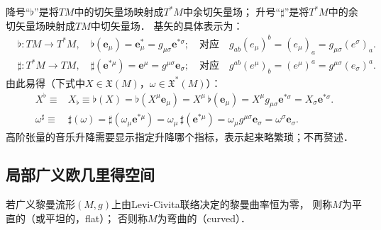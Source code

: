 降号“$\flat$”是将$TM$中的切矢量场映射成$T^*M$中余切矢量场；
升号“$\sharp$”是将$T^*M$中的余切矢量场映射成$TM$中切矢量场．
基矢的具体表示为：
\begin{align*}
	&\flat: TM \to T^*M, \quad \flat(\boldsymbol{e}_\mu) 
	= \boldsymbol{e}_\mu^{*}=g_{\mu \sigma}\boldsymbol{e}^{*\sigma} ;
	\quad \text{对应}\quad
	g_{ab} (e_\mu)^b = (e_\mu)_a =  g_{\mu \sigma} (e^\sigma)_a . \\
	&\sharp: T^*M \to TM, \quad \sharp(\boldsymbol{e}^{*\mu})  
	= \boldsymbol{e}^\mu=g^{\mu \sigma}\boldsymbol{e}_{\sigma} ;
	\quad \text{对应}\quad
	g^{ab} (e^\mu)_b  = (e^\mu)^a=  g^{\mu \sigma} (e_\sigma)^a .
\end{align*}
由此易得（下式中$X\in \mathfrak{X}(M)$，$\omega \in \mathfrak{X}^*(M)$）：
\begin{align*}
	X^{\flat} \equiv& X_{\flat} \equiv \flat(X) = \flat (X^\mu \boldsymbol{e}_\mu) = X^\mu \,  \flat ( \boldsymbol{e}_\mu)
	=X^\mu g_{\mu \sigma}\boldsymbol{e}^{*\sigma} = X_\sigma \boldsymbol{e}^{*\sigma}. \\
	\omega^{\sharp} \equiv& \sharp(\omega) = \sharp(\omega_\mu \boldsymbol{e}^{*\mu})
	= \omega_\mu \,  \sharp( \boldsymbol{e}^{*\mu}) = \omega_\mu g^{\mu \sigma}\boldsymbol{e}_{\sigma}
	=\omega^\sigma \boldsymbol{e}_{\sigma}.
\end{align*}
高阶张量的音乐升降需要显示指定升降哪个指标，表示起来略繁琐；不再赘述．



\subsection{局部广义欧几里得空间}\label{chrg:sec_local-EuclideanSpace}


\begin{definition}\label{chrg:def_flat-curved}
    若广义黎曼流形$(M,g)$上由Levi-Civita联络决定的黎曼曲率恒为零，
    则称$M$为{\heiti 平直的}（或平坦的，flat）；  否则称$M$为{\heiti 弯曲的}（curved）．
\end{definition}


